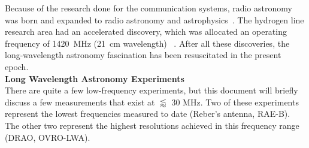 	    Because of the research done for the communication systems, radio astronomy was born and expanded to radio astronomy and astrophysics~\citep{2012PASP..124.1090H}. The hydrogen line research area had an accelerated discovery, which was allocated an operating frequency of \SI{1420}{MHz} (\SI{21}{cm} wavelength) ~\citep{10.2307/530765}. After all these discoveries, the long-wavelength astronomy fascination has been resuscitated in the present epoch.\\
	    
	    {\bf{Long Wavelength Astronomy Experiments}}\\
	    
	    There are quite a few low-frequency experiments, but this document will briefly discuss a few measurements that exist at $\lessapprox$ 30 MHz. Two of these experiments represent the lowest frequencies measured to date (Reber's antenna, RAE-B). The other two represent the highest resolutions achieved in this frequency range (DRAO, OVRO-LWA).\\
	    

